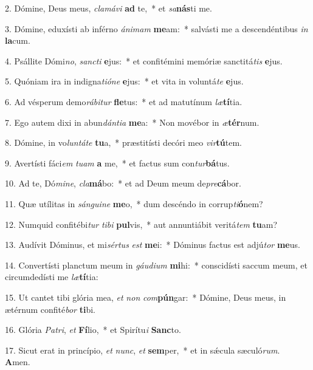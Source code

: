 2. Dómine, Deus meus, \textit{cla}\textit{má}\textit{vi} \textbf{ad} te,~*  et \textit{sa}\textbf{nás}ti me.\

3. Dómine, eduxísti ab inférno \textit{á}\textit{ni}\textit{mam} \textbf{me}am:~*  salvásti me a descendéntibus \textit{in} \textbf{la}cum.\

4. Psállite Dómi\textit{no}, \textit{sanc}\textit{ti} \textbf{e}jus:~*  et confitémini memóriæ sanctitá\textit{tis} \textbf{e}jus.\

5. Quóniam ira in indigna\textit{ti}\textit{ó}\textit{ne} \textbf{e}jus:~*  et vita in voluntá\textit{te} \textbf{e}jus.\

6. Ad vésperum demo\textit{rá}\textit{bi}\textit{tur} \textbf{fle}tus:~*  et ad matutínum \textit{læ}\textbf{tí}tia.\

7. Ego autem dixi in abun\textit{dán}\textit{ti}\textit{a} \textbf{me}a:~*  Non movébor in \textit{æ}\textbf{tér}num.\

8. Dómine, in vo\textit{lun}\textit{tá}\textit{te} \textbf{tu}a,~*  præstitísti decóri meo \textit{vir}\textbf{tú}tem.\

9. Avertísti fáci\textit{em} \textit{tu}\textit{am} \textbf{a} me,~*  et factus sum con\textit{tur}\textbf{bá}tus.\

10. Ad te, Dó\textit{mi}\textit{ne}, \textit{cla}\textbf{má}bo:~*  et ad Deum meum de\textit{pre}\textbf{cá}bor.\

11. Quæ utílitas in \textit{sán}\textit{gui}\textit{ne} \textbf{me}o,~*  dum descéndo in corrup\textit{ti}\textbf{ó}nem?\

12. Numquid confitébi\textit{tur} \textit{ti}\textit{bi} \textbf{pul}vis,~*  aut annuntiábit veritá\textit{tem} \textbf{tu}am?\

13. Audívit Dóminus, et mi\textit{sér}\textit{tus} \textit{est} \textbf{me}i:~*  Dóminus factus est adjú\textit{tor} \textbf{me}us.\

14. Convertísti planctum meum in \textit{gáu}\textit{di}\textit{um} \textbf{mi}hi:~*  conscidísti saccum meum, et circumdedísti me \textit{læ}\textbf{tí}tia:\

15. Ut cantet tibi glória mea, \textit{et} \textit{non} \textit{com}\textbf{pún}gar:~*  Dómine, Deus meus, in ætérnum confité\textit{bor} \textbf{ti}bi.\

16. Glória \textit{Pa}\textit{tri}, \textit{et} \textbf{Fí}lio,~*  et Spirítu\textit{i} \textbf{Sanc}to.\

17. Sicut erat in princípio, \textit{et} \textit{nunc}, \textit{et} \textbf{sem}per,~*  et in sǽcula sæculó\textit{rum}. \textbf{A}men.\

